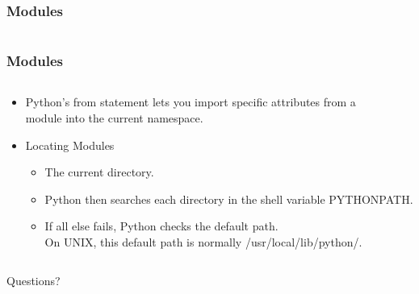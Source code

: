 \documentclass{beamer}
\begin{document}
\begin{frame}[fragile]
	\frametitle{Modules}
	\begin{columns}[c]
		\begin{column}{30cm}
			\vspace{.1cm}
		\end{column}
	\end{columns}
\end{frame}

\begin{frame}
	\frametitle{Modules}
	\begin{columns}[c]
		\begin{column}{30cm}
			\vspace{.1cm}
			\begin{itemize}
				\justifying
				\item Python's from statement lets you import specific attributes from a \\
				 module into the current namespace.
				\item Locating Modules
				\begin{itemize}
					\item The current directory.
					\item Python then searches each directory in the shell variable PYTHONPATH.
					\item If all else fails, Python checks the default path. \\
					On UNIX, this default path is normally /usr/local/lib/python/.
				\end{itemize}
			\end{itemize}
		\end{column}
	\end{columns}
\end{frame}
\begin{frame}
	\vspace{1cm}
	\begin{Huge}
		\begin{center}
			Questions?
		\end{center}
	\end{Huge}
\end{frame}
\end{document}
